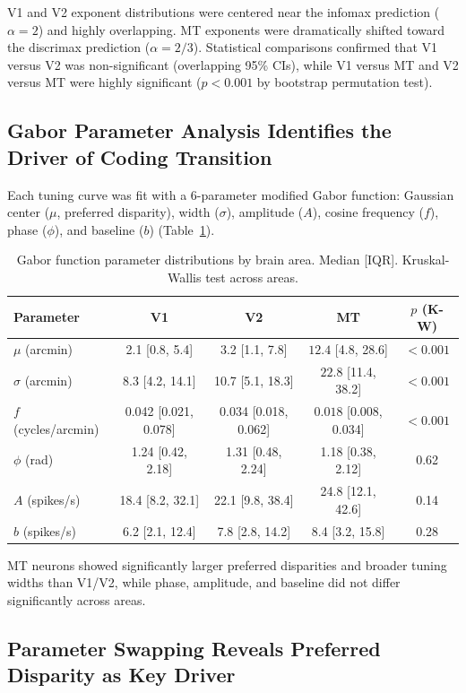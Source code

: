 \documentclass[11pt]{article}
\begin{document}
V1 and V2 exponent distributions were centered near the infomax prediction ($\alpha = 2$) and highly overlapping. MT exponents were dramatically shifted toward the discrimax prediction ($\alpha = 2/3$). Statistical comparisons confirmed that V1 versus V2 was non-significant (overlapping 95\% CIs), while V1 versus MT and V2 versus MT were highly significant ($p < 0.001$ by bootstrap permutation test).

\subsection{Gabor Parameter Analysis Identifies the Driver of Coding Transition}

Each tuning curve was fit with a 6-parameter modified Gabor function: Gaussian center ($\mu$, preferred disparity), width ($\sigma$), amplitude ($A$), cosine frequency ($f$), phase ($\phi$), and baseline ($b$) (Table~\ref{tab:gabor}).

\begin{table}[H]
\centering
\caption{Gabor function parameter distributions by brain area. Median [IQR]. Kruskal-Wallis test across areas.}
\label{tab:gabor}
\begin{tabular}{lcccc}
\toprule
Parameter & V1 & V2 & MT & $p$ (K-W) \\
\midrule
$\mu$ (arcmin) & 2.1 [0.8, 5.4] & 3.2 [1.1, 7.8] & $\mathbf{12.4}$ [4.8, 28.6] & $< 0.001$ \\
$\sigma$ (arcmin) & 8.3 [4.2, 14.1] & 10.7 [5.1, 18.3] & $\mathbf{22.8}$ [11.4, 38.2] & $< 0.001$ \\
$f$ (cycles/arcmin) & 0.042 [0.021, 0.078] & 0.034 [0.018, 0.062] & $\mathbf{0.018}$ [0.008, 0.034] & $< 0.001$ \\
$\phi$ (rad) & 1.24 [0.42, 2.18] & 1.31 [0.48, 2.24] & 1.18 [0.38, 2.12] & 0.62 \\
$A$ (spikes/s) & 18.4 [8.2, 32.1] & 22.1 [9.8, 38.4] & 24.8 [12.1, 42.6] & 0.14 \\
$b$ (spikes/s) & 6.2 [2.1, 12.4] & 7.8 [2.8, 14.2] & 8.4 [3.2, 15.8] & 0.28 \\
\bottomrule
\end{tabular}
\end{table}

MT neurons showed significantly larger preferred disparities and broader tuning widths than V1/V2, while phase, amplitude, and baseline did not differ significantly across areas.

\subsection{Parameter Swapping Reveals Preferred Disparity as Key Driver}
\end{document}
